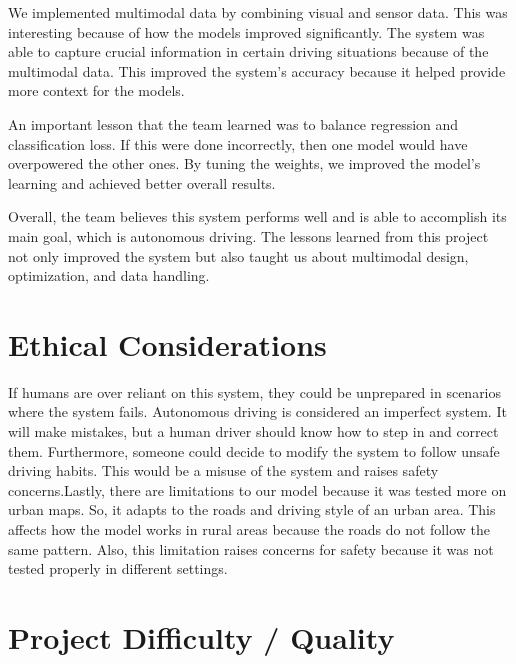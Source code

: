 \documentclass{article} %
\begin{document}
We implemented multimodal data by combining visual and sensor data. This was interesting because of how
the models improved significantly. The system was able to capture crucial information in certain driving
situations because of the multimodal data. This improved the system’s accuracy because it helped provide
more context for the models.

An important lesson that the team learned was to balance regression and classification loss. If this
were done incorrectly, then one model would have overpowered the other ones. By tuning the weights,
we improved the model's learning and achieved better overall results.

Overall, the team believes this system performs well and is able to accomplish its main goal, which is
autonomous driving. The lessons learned from this project not only improved the system but also taught
us about multimodal design, optimization, and data handling.


\section{Ethical Considerations}

If humans are over reliant on this system, they could be unprepared in scenarios where the system fails.
Autonomous driving is considered an imperfect system. It will make mistakes, but a human driver should
know how to step in and correct them. Furthermore, someone could decide to modify the system to follow
unsafe driving habits. This would be a misuse of the system and raises safety concerns.Lastly, there are limitations to our model because it was tested more on urban maps. So, it adapts to the
roads and driving style of an urban area. This affects how the model works in rural areas because the roads
do not follow the same pattern. Also, this limitation raises concerns for safety because it was not tested
properly in different settings.


\section{Project Difficulty / Quality}
\end{document}
